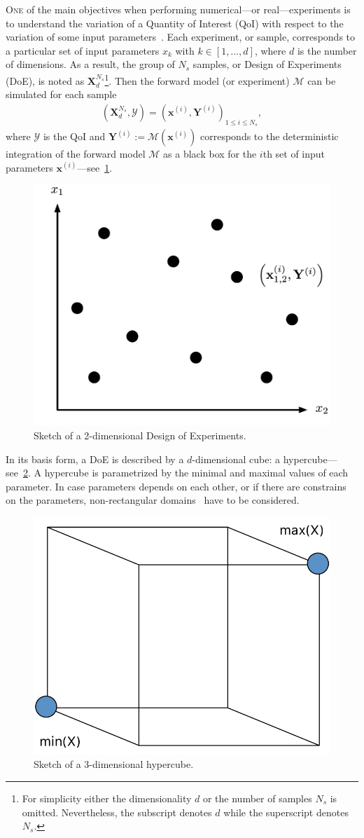 \lettrine{O}{ne} of the main objectives when performing numerical---or real---experiments is to understand the variation of a Quantity of Interest (QoI) with respect to the variation of some input parameters~\citep{Sacks1989}. Each experiment, or sample, corresponds to a particular set of input parameters $x_k$ with $k \in [1, \dots , d]$, where $d$ is the number of dimensions. As a result, the group of $N_s$ samples, or Design of Experiments (DoE), is noted as $\mathbf{X}^{N_s}_d$\footnote{For simplicity either the dimensionality $d$ or the number of samples $N_s$ is omitted. Nevertheless, the subscript denotes $d$ while the superscript denotes $N_s$.}. Then the forward model (or experiment) $\mathcal{M}$ can be simulated for each sample
\begin{align}
(\mathbf{X}^{N_s}_d, \mathcal{Y})=\left(\mathbf{x}^{(i)},\mathbf{Y}^{(i)}\right)_{1\leq i\leq N_{s}},
\end{align}
\noindent where $\mathcal{Y}$ is the QoI and $\mathbf{Y}^{(i)} := \mathcal{M}(\mathbf{x}^{(i)})$ corresponds to the deterministic integration of the forward model $\mathcal{M}$ as a black box for the $i$th set of input parameters $\mathbf{x}^{(i)}$---see~\cref{fig:doe}.

\begin{figure}[!h]
\centering
\includegraphics[width=0.5\linewidth,keepaspectratio]{fig/literature/doe.pdf}
\caption{Sketch of a 2-dimensional Design of Experiments.}
\label{fig:doe}
\end{figure}

In its basis form, a DoE is described by a $d$-dimensional cube: a hypercube---see~\cref{fig:hypercube}. A hypercube is parametrized by the minimal and maximal values of each parameter. In case parameters depends on each other, or if there are constrains on the parameters, non-rectangular domains~\citep{Lekivetz2015} have to be considered.

\begin{figure}[!h]
\centering
\includegraphics[width=0.5\linewidth,keepaspectratio]{fig/literature/hypercube.pdf}
\caption{Sketch of a 3-dimensional hypercube.}
\label{fig:hypercube}
\end{figure}


